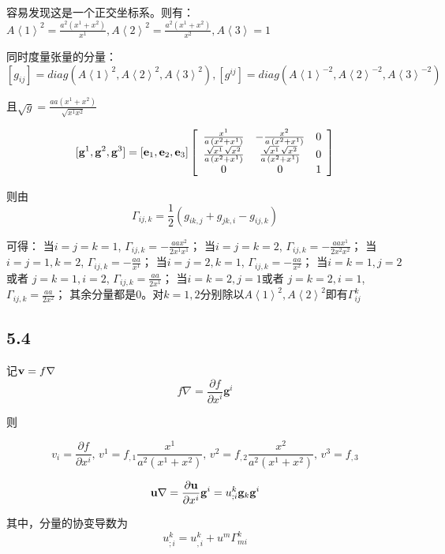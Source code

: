 \documentclass[UTF8,zihao=5]{ctexart}
\newcommand{\bm}[1]{{\mathbf{#1}}}
\newcommand*{\av}[1]{\left\langle{#1}\right\rangle}
\newcommand*{\pd}[2]{\frac{\partial #1}{\partial #2}}
\begin{document}
容易发现这是一个正交坐标系。则有：
$A\av{1}^2 = \frac{a^2(x^1+x^2)}{x^1}, A\av{2}^2 = \frac{a^2(x^1+x^2)}{x^2}, A\av{3} =1$

同时度量张量的分量：$[g_{ij}]=diag(A\av{1}^2,A\av{2}^2,A\av{3}^2),[g^{ij}]=diag(A\av{1}^{-2},A\av{2}^{-2},A\av{3}^{-2})$

且$\sqrt{g}=\frac{aa(x^1+x^2)}{\sqrt{x^1x^2}}$

$$
    [\g^1,\g^2,\g^3]=[\bm{e}_1,\bm{e}_2,\bm{e}_3]
    \left[\begin{array}{ccc} \frac{x^{1}}{a\,\left(x^{2}+x^{1}\right)} & -\frac{x^{2}}{a\,\left(x^{2}+x^{1}\right)} & 0\\ \frac{\sqrt{x^{1}}\,\sqrt{x^{2}}}{a\,\left(x^{2}+x^{1}\right)} & \frac{\sqrt{x^{1}}\,\sqrt{x^{2}}}{a\,\left(x^{2}+x^{1}\right)} & 0\\ 0 & 0 & 1 \end{array}\right]
$$

则由
$$
    \Gamma_{ij,k}=
    \frac{1}{2}
    (g_{ik,j} + g_{jk,i} - g_{ij,k})
$$

可得：
当$i=j=k=1$, $\Gamma_{ij,k}=-\frac{aax^2}{2x^1x^1}$；
当$i=j=k=2$, $\Gamma_{ij,k}=-\frac{aax^1}{2x^2x^2}$；
当$i=j=1, k=2$, $\Gamma_{ij,k}=-\frac{aa}{x^1}$；
当$i=j=2, k=1$, $\Gamma_{ij,k}=-\frac{aa}{x^2}$；
当$i=k=1, j=2$或者 $j=k=1, i=2$, $\Gamma_{ij,k}=\frac{aa}{2x^1}$；
当$i=k=2, j=1$或者 $j=k=2, i=1$, $\Gamma_{ij,k}=\frac{aa}{2x^2}$；
其余分量都是0。对$k=1,2$分别除以$A\av{1}^2,A\av{2}^2$即有$\Gamma^k_{ij}$

\subsection*{5.4}

记$\vv=f\nabla$
$$
    f\nabla=\pd{f}{x^i}\bm{g}^i
$$

则

\begin{equation}
    v_i=\pd{f}{x^i},\, v^1=f_{,1}\frac{x^1}{a^2(x^1+x^2)},\, v^2=f_{,2}\frac{x^2}{a^2(x^1+x^2)},\, v^3=f_{,3}
    \label{eq:gradf}
\end{equation}

$$
    \uu\nabla=\pd{\uu}{x^i}\bm{g}^i=u^k_{;i}\g_k\g^i
$$

其中，分量的协变导数为
$$
    u^k_{;i}=u^k_{,i} + u^m\Gamma^k_{mi}
$$
\end{document}
